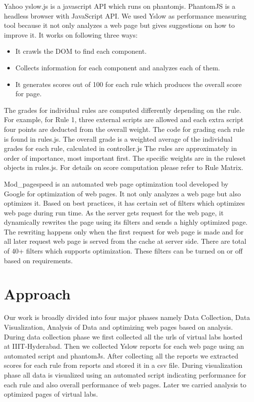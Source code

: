 \documentclass[conference]{IEEEtran}
\begin{document}
Yahoo yslow.js is a javascript API which runs on phantomjs. PhantomJS is a
headless browser with JavaScript API\cite{pjs}. We used Yslow as performance measuring
tool because it not only analyzes a web page but gives suggestions on how to
improve it. It works on following three ways:
\begin{itemize}
\item It crawls the DOM to find each component.
\item Collects information for each component and analyzes each of them.
\item It generates scores out of 100 for each rule which produces the overall
score for page.
\end{itemize}
The grades for individual rules are computed differently depending on the rule.
For example, for Rule 1, three external scripts are allowed and each extra script
four points are deducted from the overall weight. The code for grading each
rule is found in rules.js. The overall grade is a weighted average of the
individual grades for each rule, calculated in controller.js The rules are
approximately in order of importance, most important first. The specific weights
are in the ruleset objects in rules.js. For details on score computation please refer to Rule Matrix\cite{rulematrix}.

Mod\_pagespeed\cite{google:mod-pagespeed} is an automated web page optimization tool developed by Google for
optimization of web pages. It not only
analyzes a web page but also optimizes it. Based on best practices, it has
certain set of filters which optimizes web page during run time. As the server
gets request for the web page, it dynamically rewrites the page using its filters\cite{pagespeed:filters}
and sends a highly optimized page. The rewriting happens only when the first
request for web page is made and for all later request web page is served from the cache
at server side. There are total of 40+ filters which supports
optimization. These filters can be turned on or off based on requirements. 
% 
% 
\section{Approach}\label{sec-4}
Our work is broadly divided into four major phases namely Data Collection, Data
Visualization, Analysis of Data and optimizing web pages based on analysis.
During data collection phase we first collected all the urls of virtual labs
hosted at IIIT-Hyderabad. Then we collected Yslow reports for each web page
using an automated script and phantomJs. After collecting all the reports we
extracted scores for each rule from reports and stored it in a csv file. During
visualization phase all data is visualized using an automated script indicating
performance for each rule and also overall performance of web pages. Later we
carried analysis to optimized pages of virtual labs.
\end{document}
